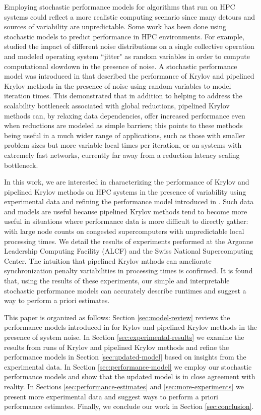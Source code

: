 \documentclass[sigconf]{acmart}
\begin{document}
Employing stochastic performance models for algorithms that run on HPC systems could reflect a more realistic computing scenario since many detours and sources of variability are unpredictable.
Some work has been done using stochastic models to predict performance in HPC environments. 
For example, \cite{agarwal2005impact} studied the impact of different noise distributions on a single collective operation and \cite{seelam2010extreme} modeled operating system 
 ``jitter" as random variables in order to compute computational slowdown in the 
  presence of noise.
A stochastic performance model was introduced in \cite{morgan2016krylov} that described the performance of Krylov and pipelined Krylov methods in the presence of noise using random variables to model iteration times. 
This demonstrated that in addition to helping to address the scalability bottleneck associated with global reductions, pipelined Krylov methods can, by relaxing data dependencies, offer increased performance even when reductions are modeled as simple barriers; this points to these methods being useful in a much wider range of applications, such as those with smaller problem sizes but more variable local times per iteration, or on systems with extremely fast networks, currently far away from a reduction latency scaling bottleneck.

In this work, we are interested in characterizing the performance of Krylov and pipelined Krylov methods on HPC systems in the presence of variability using experimental data and refining the performance model introduced in \cite{morgan2016krylov}.
Such data and models are useful because pipelined Krylov methods tend to become more useful in situations where performance data is more difficult to directly gather: with large node counts on congested supercomputers with unpredictable local processing times.
We detail the results of experiments performed at the Argonne Leadership Computing Facility (ALCF) and the Swiss National Supercomputing Center. The intuition that pipelined Krylov mthods can ameliorate synchronization penalty variabilities in processing times is confirmed. It is found that, using the results of these experiments, our simple and interpretable stochastic performance models can accurately describe runtimes and suggest a way to perform a priori estimates.

This paper is organized as follows: Section \ref{sec:model-review} reviews the performance models introduced in \cite{morgan2016krylov} for Kylov and pipelined Krylov methods in the presence of system noise. In Section \ref{sec:experimental-results} we examine the results from runs of Krylov and pipelined Krylov methods and refine the performance models in Section \ref{sec:updated-model} based on insights from the experimental data.
In Section \ref{sec:performance-model} we employ our stochastic performance models and show that the updated model is in close agreement with reality.  In Sections \ref{sec:performance-estimates} and \ref{sec:more-experiments} we present more experimental data and suggest ways to perform a priori performance estimates.  Finally, we conclude our work in Section \ref{sec:conclusion}. 
\end{document}
